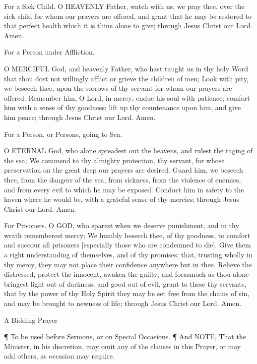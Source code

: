 For a Sick Child.
O HEAVENLY Father, watch with us, we pray thee, over the sick child for whom our prayers are offered, and grant that he may be restored to that perfect health which it is thine alone to give; through Jesus Christ our Lord. Amen.

For a Person under Affliction.

O MERCIFUL God, and heavenly Father, who hast taught us in thy holy Word that thou dost not willingly afflict or grieve the children of men; Look with pity, we beseech thee, upon the sorrows of thy servant for whom our prayers are offered. Remember him, O Lord, in mercy; endue his soul with patience; comfort him with a sense of thy goodness; lift up thy countenance upon him, and give him peace; through Jesus Christ our Lord. Amen.

For a Person, or Persons, going to Sea.

O ETERNAL God, who alone spreadest out the heavens, and rulest the raging of the sea; We commend to thy almighty protection, thy servant, for whose preservation on the great deep our prayers are desired. Guard him, we beseech thee, from the dangers of the sea, from sickness, from the violence of enemies, and from every evil to which he may be exposed. Conduct him in safety to the haven where he would be, with a grateful sense of thy mercies; through Jesus Christ our Lord. Amen.

For Prisoners.
O GOD, who sparest when we deserve punishment, and in thy wrath rememberest mercy; We humbly beseech thee, of thy goodness, to comfort and succour all prisoners [especially those who are condemned to die]. Give them a right understanding of themselves, and of thy promises; that, trusting wholly in thy mercy, they may not place their confidence anywhere but in thee. Relieve the distressed, protect the innocent, awaken the guilty; and forasmuch as thou alone bringest light out of darkness, and good out of evil, grant to these thy servants, that by the power of thy Holy Spirit they may be set free from the chains of sin, and may be brought to newness of life; through Jesus Christ our Lord. Amen.

 
 
A Bidding Prayer
 
¶ To be used before Sermons, or on Special Occasions.
¶ And NOTE, That the Minister, in his discretion, may omit any of the clauses in this Prayer, or may add others, as occasion may require.
   

